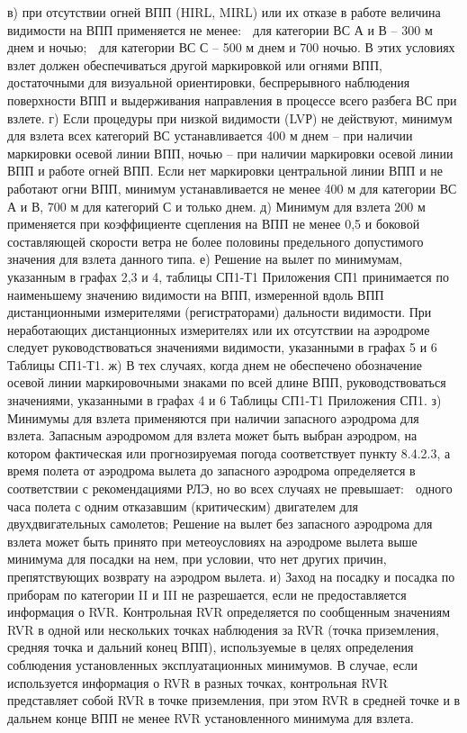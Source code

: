 в)	при отсутствии огней ВПП (HIRL, MIRL) или их отказе в работе величина видимости на ВПП применяется не менее:
	для категории ВС А и В – 300 м днем и ночью;
	для категории ВС С – 500 м днем и 700 ночью. 
В этих условиях взлет должен обеспечиваться другой маркировкой или огнями ВПП, достаточными для визуальной ориентировки, беспрерывного наблюдения поверхности ВПП и выдерживания направления в процессе всего разбега ВС при взлете.
г)	Если процедуры при низкой видимости (LVР) не действуют, минимум для взлета всех категорий ВС устанавливается 400 м днем – при наличии маркировки осевой линии ВПП, ночью – при наличии маркировки осевой линии ВПП и работе огней ВПП. Если нет маркировки центральной линии ВПП и не работают огни ВПП, минимум устанавливается не менее 400 м для категории ВС А и В, 700 м для категорий С и только днем.
д)	Минимум для взлета 200 м применяется при коэффициенте сцепления на ВПП не менее 0,5 и боковой составляющей скорости ветра не более половины предельного допустимого значения для взлета данного типа.
е)	Решение на вылет по минимумам, указанным в графах 2,3 и 4, таблицы СП1-Т1 Приложения СП1 принимается по наименьшему значению видимости на ВПП, измеренной вдоль ВПП дистанционными измерителями (регистраторами) дальности видимости. При неработающих дистанционных измерителях или их отсутствии на аэродроме следует руководствоваться значениями видимости, указанными в графах 5 и 6 Таблицы СП1-Т1.
ж)	В тех случаях, когда днем не обеспечено обозначение осевой линии маркировочными знаками по всей длине ВПП, руководствоваться значениями, указанными в графах 4 и 6 Таблицы СП1-Т1 Приложения СП1.
з)	Минимумы для взлета применяются при наличии запасного аэродрома для взлета. Запасным аэродромом для взлета может быть выбран аэродром, на котором фактическая или прогнозируемая погода соответствует пункту 8.4.2.3, а время полета от аэродрома вылета до запасного аэродрома определяется в соответствии с рекомендациями РЛЭ, но во всех случаях не превышает:
	одного часа полета с одним отказавшим (критическим) двигателем для двухдвигательных самолетов;
Решение на вылет без запасного аэродрома для взлета может быть принято при метеоусловиях на аэродроме вылета выше минимума для посадки на нем, при условии, что нет других причин, препятствующих возврату на аэродром вылета.
и)	Заход на посадку и посадка по приборам по категории II и III не разрешается, если не предоставляется информация о RVR. Контрольная RVR определяется по сообщенным значениям RVR в одной или нескольких точках наблюдения за RVR (точка приземления, средняя точка и дальний конец ВПП), используемые в целях определения соблюдения установленных эксплуатационных минимумов. В случае, если используется информация о RVR в разных точках, контрольная RVR представляет собой RVR в точке приземления, при этом RVR в средней точке и в дальнем конце ВПП не менее RVR установленного минимума для взлета.
